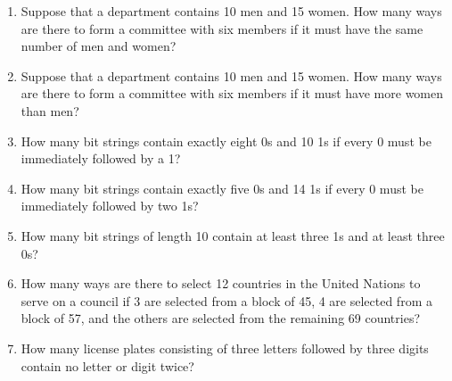 \documentclass[11pt,a4paper]{book}
\begin{document}
\begin{enumerate}
\item Suppose that a department contains 10 men and 15 women.
How many ways are there to form a committee with six members if it must have the same number of men and women?
\item Suppose that a department contains 10 men and 15 women.
How many ways are there to form a committee with six members if it must have more women than men?
\item How many bit strings contain exactly eight 0s and 10 1s if every 0 must be immediately followed by a 1?
\item How many bit strings contain exactly five 0s and 14 1s if every 0 must be immediately followed by two 1s?
\item How many bit strings of length 10 contain at least three 1s and at least three 0s?
\item How many ways are there to select 12 countries in the United Nations to serve on a council if 3 are selected from a block of 45, 4 are selected from a block of 57, and the others are selected from the remaining 69 countries?
\item How many license plates consisting of three letters followed by three digits contain no letter or digit twice?


\end{enumerate}
\end{document}
